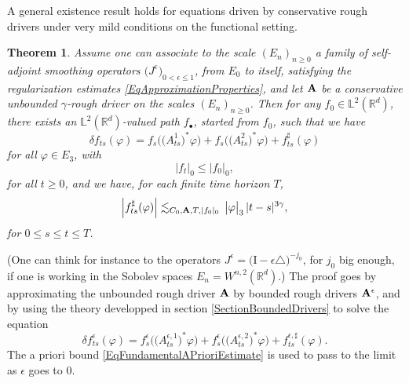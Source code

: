 \documentclass[11pt,a4paper]{amsart}
\newcommand{\RR}{\mathbb{R}}  \newcommand{\CC}{\mathbb{C}}  \newcommand{\LL}{\mathbb{L}}  \newcommand{\WW}{\mathbb{W}}
\newcommand{\ep}{\epsilon}
\renewcommand{\leq}{\leqslant}
\renewcommand{\geq}{\geqslant}
\newcommand{\ssk}{\smallskip}
\newtheorem{thm}{\hspace{-0.15cm}  {\sc Theorem} } %
\numberwithin{equation}{section} %
\begin{document}
\ssk

A general existence result holds for equations driven by conservative rough drivers under very mild conditions on the functional setting.

\begin{thm}
\label{ThmRDEHilbertGeneral}
Assume one can associate to the scale $(E_n)_{n\geq 0}$ a family of \emph{self-adjoint} smoothing operators $\big(J^\epsilon\big)_{0<\epsilon\leq 1}$, from $E_0$ to itself, satisfying the regularization estimates \eqref{EqApproximationProperties}, and let $\bf A$ be a conservative unbounded $\gamma$-rough driver on the scales $(E_n)_{n\geq 0}$. Then for any $f_0\in\LL^2(\RR^d)$, there exists an $\LL^2(\RR^d)$-valued path $f_\bullet$, started from $f_0$, such that we have
\begin{equation*}
\delta f_{ts}(\varphi) = f_s\Big(\big(A^1_{ts}\big)^*\varphi\Big) + f_s\Big(\big(A^2_{ts}\big)^*\varphi\Big) + f^\sharp_{ts}(\varphi)
\end{equation*}
for all $\varphi\in E_3$, with 
\begin{equation*}
\big| f_t\big|_0\leq \big| f_0\big|_0,
\end{equation*}
for all $ t\geq 0$, and we have, for each finite time horizon $T$,
\begin{equation}
\label{EqBoundRemainderX}
\Big| f^\sharp_{ts}(\varphi) \Big| \lesssim_{C_0,{\bf A}, T,| f_0|_0}\,\big|\varphi\big|_3\,|t-s|^{3\gamma},
\end{equation}
for $0\leq s\leq t\leq T$.
\end{thm}

\noindent (One can think for instance to the operators $J^\ep = \big(\textrm{I}-\epsilon\triangle\big)^{-j_0}$, for $j_0$ big enough, if one is working in the Sobolev spaces $E_n = W^{n,2}(\RR^d)$.) The proof goes by approximating the unbounded rough driver $\bf A$ by bounded rough drivers  ${\bf A}^\epsilon$, and by using the theory developped in section \ref{SectionBoundedDrivers} to solve the equation
\begin{equation}
\label{EqApproximatedRDE}
\delta f^\epsilon_{ts}(\varphi) = f^\epsilon_s\Big(\big(A^{\epsilon,1}_{ts}\big)^*\varphi\Big) + f^\epsilon_s\Big(\big(A^{\epsilon,2}_{ts}\big)^*\varphi\Big) + f^{\epsilon,\sharp}_{ts}(\varphi).
\end{equation}
The a priori bound \eqref{EqFundamentalAPrioriEstimate} is used to pass to the limit as  $\epsilon$ goes to $0$.

\medskip
\end{document}
